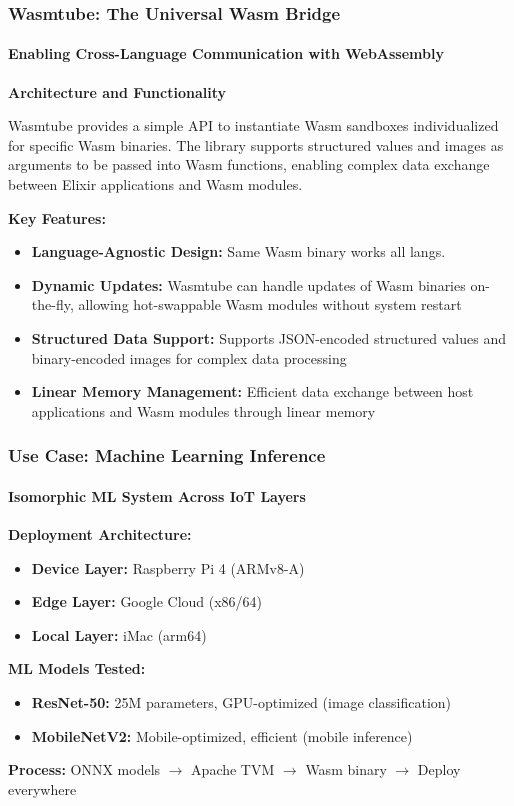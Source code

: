 \documentclass{beamer}
\begin{document}
\begin{frame}
\frametitle{Wasmtube: The Universal Wasm Bridge}
\framesubtitle{Enabling Cross-Language Communication with WebAssembly}

\textbf{Architecture and Functionality}

Wasmtube \cite{wasmtube2023} provides a simple API to instantiate Wasm sandboxes individualized for specific Wasm binaries. The library supports structured values and images as arguments to be passed into Wasm functions, enabling complex data exchange between Elixir applications and Wasm modules.

\textbf{Key Features:}
\begin{itemize}
\item \textbf{Language-Agnostic Design:} Same Wasm binary works all langs.
\item \textbf{Dynamic Updates:} Wasmtube can handle updates of Wasm binaries on-the-fly, allowing hot-swappable Wasm modules without system restart
\item \textbf{Structured Data Support:} Supports JSON-encoded structured values and binary-encoded images for complex data processing
\item \textbf{Linear Memory Management:} Efficient data exchange between host applications and Wasm modules through linear memory
\end{itemize}

\end{frame}



\begin{frame}
\frametitle{Use Case: Machine Learning Inference}
\framesubtitle{Isomorphic ML System Across IoT Layers}

\textbf{Deployment Architecture:}
\begin{itemize}
\item \textbf{Device Layer:} Raspberry Pi 4 (ARMv8-A)
\item \textbf{Edge Layer:} Google Cloud (x86/64)
\item \textbf{Local Layer:} iMac (arm64)
\end{itemize}

\textbf{ML Models Tested:}
\begin{itemize}
\item \textbf{ResNet-50:} 25M parameters, GPU-optimized (image classification)
\item \textbf{MobileNetV2:} Mobile-optimized, efficient (mobile inference)
\end{itemize}

\textbf{Process:} ONNX models $\rightarrow$ Apache TVM $\rightarrow$ Wasm binary $\rightarrow$ Deploy everywhere
\end{frame}
\end{document}
